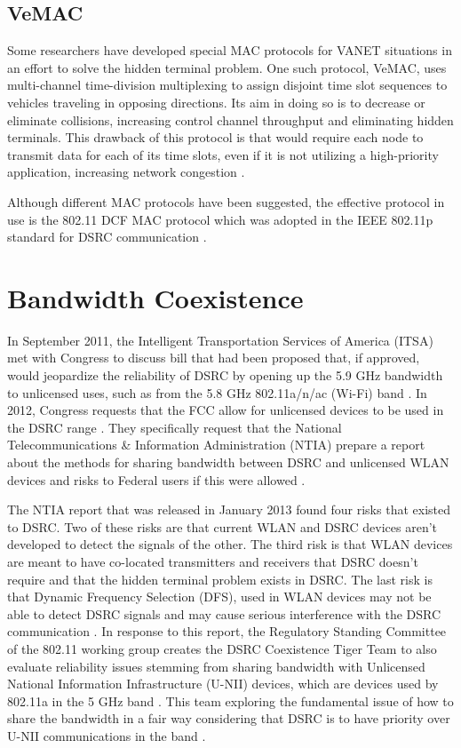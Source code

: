 \documentclass[twoside,conference]{IEEEtran}
\begin{document}
		\subsection{VeMAC}\label{sec:vemac}
			Some researchers have developed special MAC protocols for VANET situations in an effort to solve the hidden terminal problem. One such protocol, VeMAC, uses multi-channel time-division multiplexing to assign disjoint time slot sequences to vehicles traveling in opposing directions. Its aim in doing so is to decrease or eliminate collisions, increasing control channel throughput and eliminating hidden terminals\cite{Omar2013}. This drawback of this protocol is that would require each node to transmit data for each of its time slots, even if it is not utilizing a high-priority application, increasing network congestion \cite{Kolte2014}. 
		
		Although different MAC protocols have been suggested, the effective protocol in use is the 802.11 DCF MAC protocol which was adopted in the IEEE 802.11p standard for DSRC communication \cite{Hassan2011}.
		
\section{Bandwidth Coexistence}\label{sec:coexistence}
		In September 2011, the Intelligent Transportation Services of America (ITSA) met with Congress to discuss bill that had been proposed that, if approved, would jeopardize the reliability of DSRC by opening up the 5.9 GHz bandwidth to unlicensed uses, such as from the 5.8 GHz 802.11a/n/ac (Wi-Fi) band \cite{ITSA2011,Lansford2013}.  In 2012, Congress requests that the FCC allow for unlicensed devices to be used in the DSRC range \cite{ITSA2014}.  They specifically request that the National Telecommunications \& Information Administration (NTIA) prepare a report about the methods for sharing bandwidth between DSRC and unlicensed WLAN devices and risks to Federal users if this were allowed \cite{HR2012}.  
		
		The NTIA report that was released in January 2013 found four risks that existed to DSRC.  Two of these risks are that current WLAN and DSRC devices aren't developed to detect the signals of the other. The third risk is that WLAN devices are meant to have co-located transmitters and receivers that DSRC doesn't require and that the hidden terminal problem exists in DSRC. The last risk is that Dynamic Frequency Selection (DFS), used in WLAN devices may not be able to detect DSRC signals and may cause serious interference with the DSRC communication \cite[pp. 53--54]{NTIA2013}.  In response to this report, the Regulatory Standing Committee of the 802.11 working group creates the DSRC Coexistence Tiger Team to also evaluate reliability issues stemming from sharing bandwidth with Unlicensed National Information Infrastructure (U-NII) devices, which are devices used by 802.11a in the 5 GHz band \cite[p. 14]{Lansford2013}. This team exploring the fundamental issue of how to share the bandwidth in a fair way considering that DSRC is to have priority over U-NII communications in the band \cite[p. 5]{Lansford2014}.
		
\end{document}

